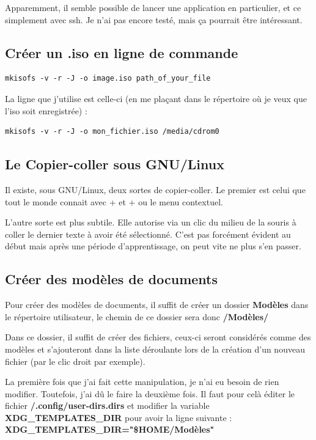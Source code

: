 \documentclass[a4paper,twoside]{article}
\begin{document}
\bigskip

Apparemment, il semble possible de lancer une application en particulier, et ce simplement avec ssh. Je n'ai pas encore testé, mais ça pourrait être intéressant.

\subsection{Créer un .iso en ligne de commande}
\begin{verbatim}
mkisofs -v -r -J -o image.iso path_of_your_file
\end{verbatim}

\begin{remarque}
La ligne que j'utilise est celle-ci (en me plaçant dans le répertoire où je veux que l'iso soit enregistrée) :
\begin{verbatim}
mkisofs -v -r -J -o mon_fichier.iso /media/cdrom0
\end{verbatim}
\end{remarque}




\subsection{Le Copier-coller sous GNU/Linux}
Il existe, sous GNU/Linux, deux sortes de copier-coller. Le premier est celui que tout le monde connait avec + et + ou le menu contextuel.\par
L'autre sorte est plus subtile. Elle autorise via un clic du milieu de la souris à coller le dernier texte à avoir été sélectionné. C'est pas forcément évident au début mais après une période d'apprentissage, on peut vite ne plus s'en passer.\par

\subsection{Créer des modèles de documents}
Pour créer des modèles de documents, il suffit de créer un dossier \textbf{Modèles} dans le répertoire utilisateur, le chemin de ce dossier sera donc \textbf{\texttildelow/Modèles/}

Dans ce dossier, il suffit de créer des fichiers, ceux-ci seront considérés comme des modèles et s'ajouteront dans la liste déroulante lors de la création d'un nouveau fichier (par le clic droit par exemple).

\begin{remarque}
La première fois que j'ai fait cette manipulation, je n'ai eu besoin de rien modifier. Toutefois, j'ai dû le faire la deuxième fois. Il faut pour celà éditer le fichier \textbf{\texttildelow/.config/user-dirs.dirs} et modifier la variable \textbf{XDG\_TEMPLATES\_DIR} pour avoir la ligne suivante : \textbf{XDG\_TEMPLATES\_DIR="\$HOME/Modèles"}
\end{remarque}
\end{document}
